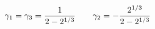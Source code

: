 \documentclass[preview]{standalone}
\begin{document}
\begin{align*}
\special{dvisvgm:raw <g id='unique000'>}\gamma_1 = \gamma_3 = \frac{1}{2 - 2^{1/3}} \qquad \gamma_2 = -\frac{2^{1/3}}{2 - 2^{1/3}}\special{dvisvgm:raw </g>}
\end{align*}
\end{document}

